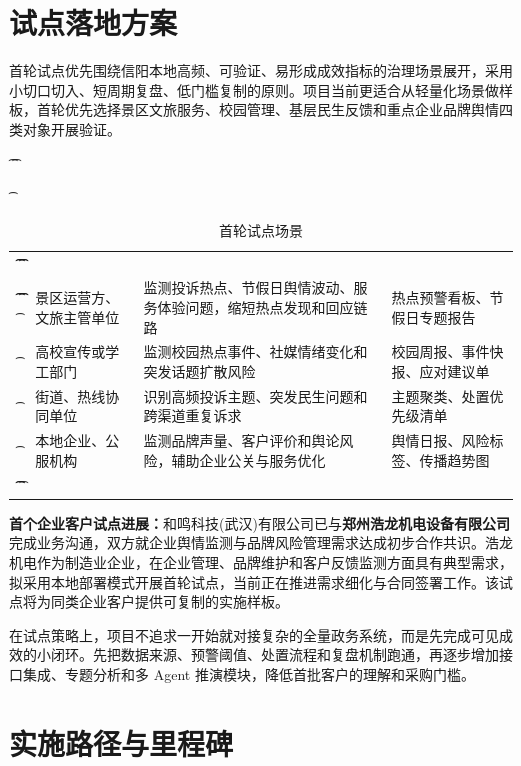 \section{试点落地方案}

首轮试点优先围绕信阳本地高频、可验证、易形成成效指标的治理场景展开，采用小切口切入、短周期复盘、低门槛复制的原则。项目当前更适合从轻量化场景做样板，首轮优先选择景区文旅服务、校园管理、基层民生反馈和重点企业品牌舆情四类对象开展验证。

\begin{table}[htbp]
	\t\centering
	\t\caption{首轮试点场景}
	\t\begin{tabularx}{\textwidth}{|L{2.6cm}L{3.1cm}YL{2.8cm}|}
		\t\t\toprule
		\t\t{} &  &                     &   \\
		\t\t\midrule
		\t\t{}
		\t{}         & 景区运营方、文旅主管单位   & 监测投诉热点、节假日舆情波动、服务体验问题，缩短热点发现和回应链路 & 热点预警看板、节假日专题报告  \\
		\t{}         & 高校宣传或学工部门      & 监测校园热点事件、社媒情绪变化和突发话题扩散风险          & 校园周报、事件快报、应对建议单 \\
		\t{}         & 街道、热线协同单位      & 识别高频投诉主题、突发民生问题和跨渠道重复诉求           & 主题聚类、处置优先级清单    \\
		\t{}         & 本地企业、公服机构      & 监测品牌声量、客户评价和舆论风险，辅助企业公关与服务优化      & 舆情日报、风险标签、传播趋势图 \\
		\t\t\bottomrule
		\t\end{tabularx}
\end{table}

\textbf{首个企业客户试点进展：}和鸣科技(武汉)有限公司已与\textbf{郑州浩龙机电设备有限公司}完成业务沟通，双方就企业舆情监测与品牌风险管理需求达成初步合作共识。浩龙机电作为制造业企业，在企业管理、品牌维护和客户反馈监测方面具有典型需求，拟采用本地部署模式开展首轮试点，当前正在推进需求细化与合同签署工作。该试点将为同类企业客户提供可复制的实施样板。

在试点策略上，项目不追求一开始就对接复杂的全量政务系统，而是先完成可见成效的小闭环。先把数据来源、预警阈值、处置流程和复盘机制跑通，再逐步增加接口集成、专题分析和多 Agent 推演模块，降低首批客户的理解和采购门槛。

\section{实施路径与里程碑}

